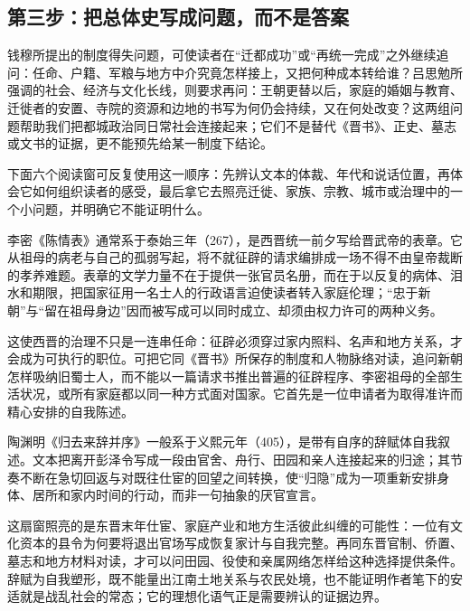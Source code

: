 \subsection{第三步：把总体史写成问题，而不是答案}

钱穆所提出的制度得失问题，可使读者在“迁都成功”或“再统一完成”之外继续追问：任命、户籍、军粮与地方中介究竟怎样接上，又把何种成本转给谁？吕思勉所强调的社会、经济与文化长线，则要求再问：王朝更替以后，家庭的婚姻与教育、迁徙者的安置、寺院的资源和边地的书写为何仍会持续，又在何处改变？这两组问题帮助我们把都城政治同日常社会连接起来；它们不是替代《晋书》、正史、墓志或文书的证据，更不能预先给某一制度下结论。

下面六个阅读窗可反复使用这一顺序：先辨认文本的体裁、年代和说话位置，再体会它如何组织读者的感受，最后拿它去照亮迁徙、家族、宗教、城市或治理中的一个小问题，并明确它不能证明什么。

\begin{sourcenote}
李密《陈情表》通常系于泰始三年（267），是西晋统一前夕写给晋武帝的表章。它从祖母的病老与自己的孤弱写起，将不就征辟的请求编排成一场不得不由皇帝裁断的孝养难题。表章的文学力量不在于提供一张官员名册，而在于以反复的病体、泪水和期限，把国家征用一名士人的行政语言迫使读者转入家庭伦理；“忠于新朝”与“留在祖母身边”因而被写成可以同时成立、却须由权力许可的两种义务。

这使西晋的治理不只是一连串任命：征辟必须穿过家内照料、名声和地方关系，才会成为可执行的职位。可把它同《晋书》所保存的制度和人物脉络对读，追问新朝怎样吸纳旧蜀士人，而不能以一篇请求书推出普遍的征辟程序、李密祖母的全部生活状况，或所有家庭都以同一种方式面对国家。它首先是一位申请者为取得准许而精心安排的自我陈述。
\end{sourcenote}

\begin{sourcenote}
陶渊明《归去来辞并序》一般系于义熙元年（405），是带有自序的辞赋体自我叙述。文本把离开彭泽令写成一段由官舍、舟行、田园和亲人连接起来的归途；其节奏不断在急切回返与对既往仕宦的回望之间转换，使“归隐”成为一项重新安排身体、居所和家内时间的行动，而非一句抽象的厌官宣言。

这扇窗照亮的是东晋末年仕宦、家庭产业和地方生活彼此纠缠的可能性：一位有文化资本的县令为何要将退出官场写成恢复家计与自我完整。再同东晋官制、侨置、墓志和地方材料对读，才可以问田园、役使和亲属网络怎样给这种选择提供条件。辞赋为自我塑形，既不能量出江南土地关系与农民处境，也不能证明作者笔下的安适就是战乱社会的常态；它的理想化语气正是需要辨认的证据边界。
\end{sourcenote}

